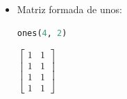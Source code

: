 \documentclass[a4,11pt]{aleph-notas}
\begin{document}
\begin{itemize}
\item
    Matriz formada de unos:
\begin{pycodigo}
    \begin{ipynbcodigo}\begin{lstlisting}[language=Python]
ones(4, 2)
    \end{lstlisting}\end{ipynbcodigo}
    \begin{ipynbsalida}[2mm]
$\displaystyle \left[\begin{matrix}1 & 1\\1 & 1\\1 & 1\\1 & 1\end{matrix}\right]$
    \end{ipynbsalida}
\end{pycodigo}
\end{itemize}
\end{document}
